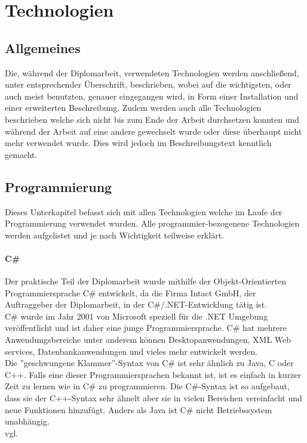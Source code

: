 \renewcommand{\theauthor}{Dario Wagner}
\chapter{Technologien}
\label{sec:Technologien}
\section{Allgemeines}
\label{sec:TechnologieAllgemeines}
Die, während der Diplomarbeit, verwendeten Technologien werden anschließend, unter entsprechender Überschrift, beschrieben, wobei auf die wichtigsten, oder auch meist benutzten, genauer eingegangen wird, in Form einer Installation und einer erweiterten Beschreibung. Zudem werden auch alle Technologien beschrieben welche sich nicht bis zum Ende der Arbeit durchsetzen konnten und während der Arbeit auf eine andere gewechselt wurde oder diese überhaupt nicht mehr verwendet wurde. Dies wird jedoch im Beschreibungstext kenntlich gemacht.
\section{Programmierung}
\label{sec:TechnologieProgrammierung}
Dieses Unterkapitel befasst sich mit allen Technologien welche im Laufe der Programmierung verwendet wurden. Alle programmier-bezogenene Technologien werden aufgelistet und je nach Wichtigkeit teilweise erklärt.
\subsubsection{C\#}
\label{sec:CSharp}
Der praktische Teil der Diplomarbeit wurde mithilfe der Objekt-Orientierten Programmiersprache C\# entwickelt, da die Firma Intact GmbH, der Auftraggeber der Diplomarbeit, in der C\#/.NET-Entwicklung tätig ist. \\ \break
C\# wurde im Jahr 2001 von Microsoft speziell für die .NET Umgebung veröffentlicht und ist daher eine junge Programmiersprache. C\# hat mehrere Anwendungsbereiche unter anderem können Desktopanwendungen, XML Web services, Datenbankanwendungen und vieles mehr entwickelt werden. \\ \break
Die ''geschwungene Klammer''-Syntax von C\# ist sehr ähnlich zu Java, C oder C++. Falls eine dieser Programmiersprachen bekannt ist, ist es einfach in kurzer Zeit zu lernen wie in C\# zu programmieren. Die C\#-Syntax ist so aufgebaut, dass sie der C++-Syntax sehr ähnelt aber sie in vielen Bereichen vereinfacht und neue Funktionen hinzufügt. Anders als Java ist C\# nicht Betriebssystem unabhängig. \\vgl. \cite{TechnologieCSharpErklaerung} 
